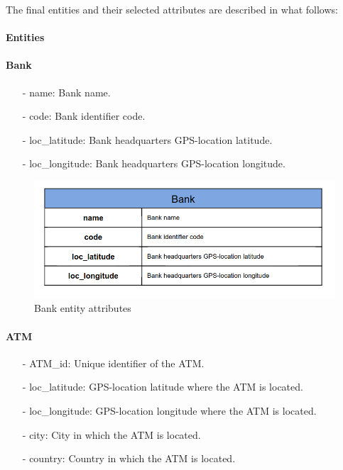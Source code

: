 \documentclass{article}
\begin{document}
The final entities and their selected attributes are described in what follows:

\paragraph{Entities\\}

\paragraph{Bank}

\begin{itemize}
\item[-] name: Bank name.
\item[-] code: Bank identifier code.
\item[-] loc\_latitude: Bank headquarters GPS-location latitude.
\item[-] loc\_longitude: Bank headquarters GPS-location longitude.
\end{itemize} 

\begin{figure}[H]
    \centering
    \includegraphics[scale = 0.4]{images/bank.png}
    \caption{Bank entity attributes}
    \label{img:pg-bank}
\end{figure}

\paragraph{ATM}

\begin{itemize}
\item[-] ATM\_id: Unique identifier of the ATM.
\item[-] loc\_latitude: GPS-location latitude where the ATM is located.
\item[-] loc\_longitude: GPS-location longitude where the ATM is located.
\item[-] city: City in which the ATM is located.
\item[-] country: Country in which the ATM is located.
\end{itemize}
\end{document}
